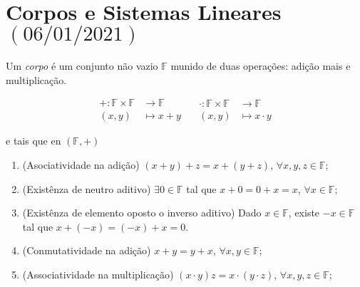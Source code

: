\chapter{Corpos e Sistemas Lineares\quad$\left(06/01/2021\right)$}

\begin{definition}[Corpo]

	Um \emph{corpo} é um conjunto não vazio $\mathbb{F}$
	munido de duas operações: adição mais e multiplicação.

	\[
		\begin{aligned}
			+\colon\mathbb{F}\times\mathbb{F} & \longrightarrow\mathbb{F} \\
			\left(x,y\right)                  & \longmapsto x+y
		\end{aligned}\quad
		\begin{aligned}
			\cdot\colon\mathbb{F}\times\mathbb{F} & \longrightarrow\mathbb{F} \\
			\left(x,y\right)                      & \longmapsto x\cdot y
		\end{aligned}
	\]

	e tais que en $\left(\mathbb{F},+\right)$

	\begin{enumerate}[label={A\arabic*.},leftmargin=0em,itemindent=*]
		\item\label{adição:1}

		      (Asociatividade na adição)
		      $\left(x+y\right)+z=x+\left(y+z\right)$,
		      $\forall x,y,z\in\mathbb{F}$;

		\item\label{adição:2}

		      (Existênza de neutro aditivo)
		      $\exists0\in\mathbb{F}$ tal que $x+0=0+x=x$,
		      $\forall x\in\mathbb{F}$;

		\item\label{adição:3}

		      (Existênza de elemento oposto o inverso aditivo)
		      Dado $x\in\mathbb{F}$, existe $-x\in\mathbb{F}$ tal que
		      $x+\left(-x\right)=\left(-x\right)+x=0$.

		\item\label{adição:4}

		      (Conmutatividade na adição)
		      $x+y=y+x$, $\forall x,y\in\mathbb{F}$;

		\item\label{adição:5}

		      (Associatividade na multiplicação)
		      $\left(x\cdot y\right)z=x\cdot\left(y\cdot z\right)$,
		      $\forall x,y,z\in\mathbb{F}$;
	\end{enumerate}


\end{definition}
